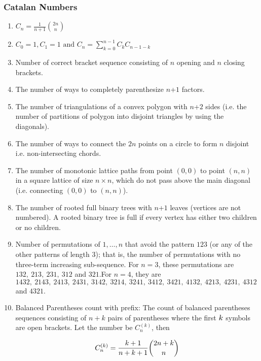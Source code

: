\subsubsection{Catalan Numbers}\begin{enumerate}

            
            \item $\displaystyle C_n=\frac{1}{n+1}{2n \choose n}$
            \item $\displaystyle C_0=1,C_1=1\text{ and }C_n=\sum \limits_{k=0}^{n-1}C_k C_{n-1-k}$
            \item Number of correct bracket sequence consisting of $n$ opening and $n$ closing brackets.
            \item The number of ways to completely parenthesize $n$+$\displaystyle 1$ factors.
            \item The number of triangulations of a convex polygon with $n$+$\displaystyle 2$ sides (i.e. the number of
                partitions
                of polygon into disjoint triangles by using the diagonals).
            \item The number of ways to connect the $\displaystyle 2n$ points on a circle to form $n$ disjoint i.e.
                non-intersecting chords.
            \item The number of monotonic lattice paths from point $\displaystyle (0,0)$ to point $\displaystyle (n,n)$ in
                a
                square lattice of size $n\times n$, which do not pass above the main diagonal (i.e. connecting
                $\displaystyle
                (0,0)$ to $\displaystyle (n,n)$).
            \item The number of rooted full binary trees with $n$+$\displaystyle 1$ leaves (vertices are not numbered). A
                rooted
                binary tree is full if every vertex has either two children or no children.
            \item Number of permutations of $\displaystyle {1, …, n}$ that avoid the pattern $\displaystyle 123$ (or any
                of
                the
                other patterns of length $3$); that is, the number of permutations with no three-term increasing
                sub-sequence.
                For $n = 3$, these permutations are $\displaystyle 132,\ 213,\ 231,\ 312$ and $321.$\displaystyle For $n
                =
                4$,
                they are $\displaystyle 1432,\ 2143,\ 2413,\ 2431,\ 3142,\ 3214,\ 3241,\ 3412,\ 3421,\ 4132,\ 4213,\
                4231,\
                4312$ and $4321.$
            \item 
                Balanced Parentheses count with prefix:
                    The count of balanced parentheses sequences consisting of $n+k$ pairs of parentheses where the first
                    $\displaystyle \displaystyle k$ symbols are open brackets. Let the number be $\displaystyle
                    C_n^{(k)}$,
                    then
                

                \[\displaystyle \displaystyle C_n^{(k)} = \frac{k+1}{n+k+1} \binom{2n+k}{n}\]
                \end{enumerate}
